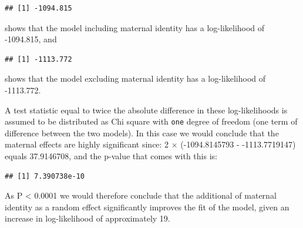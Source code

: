 \documentclass[
  12pt,
]{book}
\newenvironment{Shaded}{\begin{snugshade}}{\end{snugshade}}
\newcommand{\DecValTok}[1]{\textcolor[rgb]{0.00,0.00,0.81}{#1}}
\newcommand{\KeywordTok}[1]{\textcolor[rgb]{0.13,0.29,0.53}{\textbf{#1}}}
\newcommand{\NormalTok}[1]{#1}
\newcommand{\OperatorTok}[1]{\textcolor[rgb]{0.81,0.36,0.00}{\textbf{#1}}}
\newcommand{\StringTok}[1]{\textcolor[rgb]{0.31,0.60,0.02}{#1}}
\begin{document}
\begin{Shaded}
\end{Shaded}

\begin{verbatim}
## [1] -1094.815
\end{verbatim}

shows that the model including maternal identity has a log-likelihood of -1094.815, and

\begin{Shaded}
\end{Shaded}

\begin{verbatim}
## [1] -1113.772
\end{verbatim}

shows that the model excluding maternal identity has a log-likelihood of -1113.772.

A test statistic equal to twice the absolute difference in these log-likelihoods is assumed to be distributed as Chi square with \texttt{one} degree of freedom (one term of difference between the two models). In this case we would conclude that the maternal effects are highly significant since:
2 \(\times\) (-1094.8145793 - -1113.7719147) equals 37.9146708, and the p-value that comes with this is:

\begin{Shaded}
\end{Shaded}

\begin{verbatim}
## [1] 7.390738e-10
\end{verbatim}

As P \textless{} 0.0001 we would therefore conclude that the additional of maternal identity as a random effect significantly improves the fit of the model, given an increase in log-likelihood of approximately 19.
\end{document}
